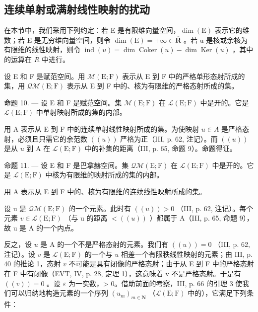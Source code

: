 \subsection{连续单射或满射线性映射的扰动}

在本节中，我们采用下列约定：若 E 是有限维向量空间，\(\dim(\mathrm{E})\) 表示它的维数；若 E 是无穷维向量空间，则令 \(\dim(\mathrm{E}) = +\infty \in \overline{\mathbf{R}}\) 。若 u 是核或余核为有限维的线性映射，则令 \(\operatorname{ind}(u) = \dim \operatorname{Coker}(u) - \dim \operatorname{Ker}(u)\) ，其中的运算在 \(\overline{R}\) 中进行。

设 E 和 F 是赋范空间。用 \(\mathcal{M}(\mathrm{E};\mathrm{F})\) 表示从 E 到 F 中的严格单形态射所成的集，用 \(\mathcal{Q}\mathcal{M}(\mathrm{E};\mathrm{F})\) 表示从 E 到 F 中的、核为有限维的严格态射所成的集。

命题 10. --- 设 E 和 F 是赋范空间。集 \(\mathcal{M}(\mathrm{E};\mathrm{F})\) 在 \(\mathcal{L}(\mathrm{E};\mathrm{F})\) 中是开的。它是 \(\mathcal{L}(\mathrm{E};\mathrm{F})\) 中单射映射所成的集的内部。

用 A 表示从 E 到 F 中的连续单射线性映射所成的集。为使映射 \(u \in A\) 是严格态射，必须且只需它的余范数 \(((u))\) 严格为正（III, p. 62, 注记）。而 \(((u))\) 是从 \(u\) 到 A 在 \(\mathcal{L}(\mathrm{E};\mathrm{F})\) 中的补集的距离（III, p. 65, 命题 9）。命题得证。

命题 11. --- 设 E 和 F 是巴拿赫空间。集 \(\mathcal{Q}\mathcal{M}(\mathrm{E};\mathrm{F})\) 在 \(\mathcal{L}(\mathrm{E};\mathrm{F})\) 中是开的。它是 \(\mathcal{L}(\mathrm{E};\mathrm{F})\) 中核为有限维的映射所成的集的内部。

用 A 表示从 E 到 F 中的、核为有限维的连续线性映射所成的集。

设 u 是 \(\mathcal{Q}\mathcal{M}(\mathrm{E};\mathrm{F})\) 的一个元素。此时有 \(((u)) > 0\) （III, p. 62, 注记）。每个元素 \(v \in \mathcal{L}(\mathrm{E};\mathrm{F})\) （与 u 的距离 \(<((u))\) ）都属于 A（III, p. 65, 命题 9），故 u 是 A 的一个内点。

反之，设 \(u\) 是 A 的一个不是严格态射的元素。我们有 \(((u)) = 0\) （III, p. 62, 注记）。设 \(v\) 是 \(\mathcal{L}(\mathrm{E};\mathrm{F})\) 的一个与 \(u\) 相差一个有限秩线性映射的元素；由 III, p. 40 的推论 1，态射 \(v\) 不可能是具有闭像的严格态射；由于从 E 到 F 中的严格态射在 F 中有闭像（EVT, IV, p. 28, 定理 1），这意味着 v 不是严格态射。于是有 \(((v)) = 0\) 。设 \(\varepsilon\) 为一实数，\textgreater{} 0。借助前面的考察，III, p. 66 的引理 3 使我们可以归纳地构造元素的一个序列 \((u_{m})_{m \in \mathbf{N}}\) （\(\mathcal{L}(\mathrm{E}; \mathrm{F})\) 中的），它满足下列条件：


